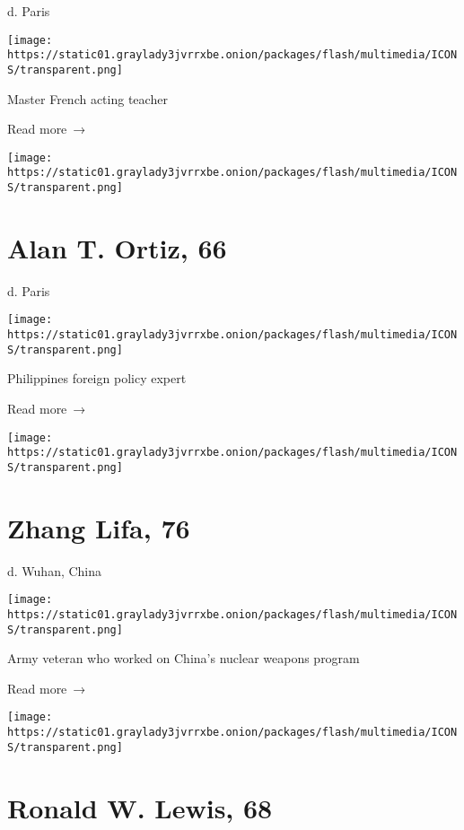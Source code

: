 d. Paris

\texttt{[image: https://static01.graylady3jvrrxbe.onion/packages/flash/multimedia/ICONS/transparent.png]}

Master French acting teacher

 Read more~→

\href{https://www.nytimes3xbfgragh.onion/2020/04/10/obituaries/alan-ortiz-dead-coronavirus.html}{}

\texttt{[image: https://static01.graylady3jvrrxbe.onion/packages/flash/multimedia/ICONS/transparent.png]}

\hypertarget{alan-t-ortiz-66}{%
\section{Alan T. Ortiz, 66}\label{alan-t-ortiz-66}}

d. Paris

\texttt{[image: https://static01.graylady3jvrrxbe.onion/packages/flash/multimedia/ICONS/transparent.png]}

Philippines foreign policy expert

 Read more~→

\href{https://www.nytimes3xbfgragh.onion/2020/04/10/obituaries/zhang-lifa-dead-coronavirus.html}{}

\texttt{[image: https://static01.graylady3jvrrxbe.onion/packages/flash/multimedia/ICONS/transparent.png]}

\hypertarget{zhang-lifa-76}{%
\section{Zhang Lifa, 76}\label{zhang-lifa-76}}

d. Wuhan, China

\texttt{[image: https://static01.graylady3jvrrxbe.onion/packages/flash/multimedia/ICONS/transparent.png]}

Army veteran who worked on China's nuclear weapons program

 Read more~→

\href{https://www.nytimes3xbfgragh.onion/2020/04/09/us/ronald-w-lewis-dead-coronavirus.html}{}

\texttt{[image: https://static01.graylady3jvrrxbe.onion/packages/flash/multimedia/ICONS/transparent.png]}

\hypertarget{ronald-w-lewis-68}{%
\section{Ronald W. Lewis, 68}\label{ronald-w-lewis-68}}

